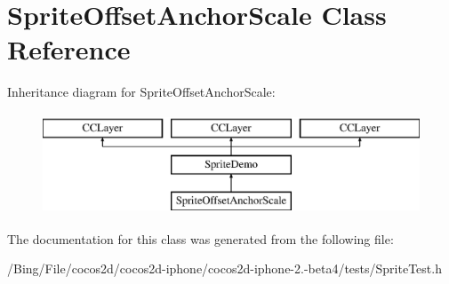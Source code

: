 \hypertarget{interface_sprite_offset_anchor_scale}{\section{Sprite\-Offset\-Anchor\-Scale Class Reference}
\label{interface_sprite_offset_anchor_scale}
}
Inheritance diagram for Sprite\-Offset\-Anchor\-Scale\-:\begin{figure}[H]
\begin{center}
\leavevmode
\includegraphics[height=3.000000cm]{interface_sprite_offset_anchor_scale}
\end{center}
\end{figure}


The documentation for this class was generated from the following file\-:\begin{DoxyCompactItemize}
\item 
/\-Bing/\-File/cocos2d/cocos2d-\/iphone/cocos2d-\/iphone-\/2.-\/beta4/tests/Sprite\-Test.\-h\end{DoxyCompactItemize}
